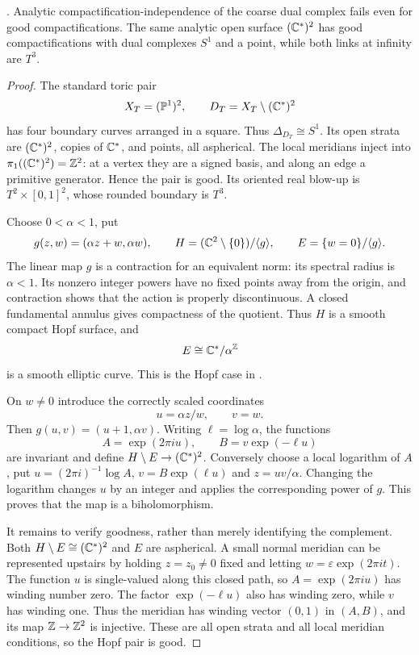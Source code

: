 \begin{example}
\label{P4c3}
. Analytic compactification-independence of the coarse dual complex fails even for good compactifications. The same analytic open surface $(\mathbb C^*)^2$ has good compactifications with dual complexes $S^1$ and a point, while both links at infinity are $T^3$.
\end{example}
\begin{proof}
The standard toric pair
\[
 X_T=(\mathbb P^1)^2,\qquad D_T=X_T\setminus(\mathbb C^*)^2
\]
has four boundary curves arranged in a square. Thus $\Delta_{D_T}\cong S^1$. Its open strata are $(\mathbb C^*)^2$, copies of $\mathbb C^*$, and points, all aspherical. The local meridians inject into $\pi_1((\mathbb C^*)^2)=\mathbb Z^2$: at a vertex they are a signed basis, and along an edge a primitive generator. Hence the pair is good. Its oriented real blow-up is $T^2\times[0,1]^2$, whose rounded boundary is $T^3$.

Choose $0<\alpha<1$, put
\[
 g(z,w)=(\alpha z+w,\alpha w),
 \qquad H=(\mathbb C^2\setminus\{0\})/\langle g\rangle,
 \qquad E=\{w=0\}/\langle g\rangle.
\]
The linear map $g$ is a contraction for an equivalent norm: its spectral radius is $\alpha<1$. Its nonzero integer powers have no fixed points away from the origin, and contraction shows that the action is properly discontinuous. A closed fundamental annulus gives compactness of the quotient. Thus $H$ is a smooth compact Hopf surface, and
\[
 E\cong\mathbb C^*/\alpha^{\mathbb Z}
\]
is a smooth elliptic curve. This is the Hopf case in \cite[Theorem~2, p.~81; \S4(d), p.~88]{Ueda1979}.

On $w\ne0$ introduce the correctly scaled coordinates
\[
 u=\alpha z/w,\qquad v=w.
\]
Then $g(u,v)=(u+1,\alpha v)$. Writing $\ell=\log\alpha$, the functions
\[
 A=\exp(2\pi i u),\qquad B=v\exp(-\ell u)
\]
are invariant and define $H\setminus E\to(\mathbb C^*)^2$. Conversely choose a local logarithm of $A$, put $u=(2\pi i)^{-1}\log A$, $v=B\exp(\ell u)$ and $z=uv/\alpha$. Changing the logarithm changes $u$ by an integer and applies the corresponding power of $g$. This proves that the map is a biholomorphism.

It remains to verify goodness, rather than merely identifying the complement. Both $H\setminus E\cong(\mathbb C^*)^2$ and $E$ are aspherical. A small normal meridian can be represented upstairs by holding $z=z_0\ne0$ fixed and letting $w=\varepsilon\exp(2\pi it)$. The function $u$ is single-valued along this closed path, so $A=\exp(2\pi iu)$ has winding number zero. The factor $\exp(-\ell u)$ also has winding zero, while $v$ has winding one. Thus the meridian has winding vector $(0,1)$ in $(A,B)$, and its map $\mathbb Z\to\mathbb Z^2$ is injective. These are all open strata and all local meridian conditions, so the Hopf pair is good.


\end{proof}
